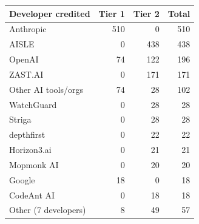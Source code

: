 \begin{tabular}{lrrr}
\toprule
Developer credited & Tier 1 & Tier 2 & Total \\
\midrule
Anthropic & 510 & 0 & 510 \\
AISLE & 0 & 438 & 438 \\
OpenAI & 74 & 122 & 196 \\
ZAST.AI & 0 & 171 & 171 \\
Other AI tools/orgs & 74 & 28 & 102 \\
WatchGuard & 0 & 28 & 28 \\
Striga & 0 & 28 & 28 \\
depthfirst & 0 & 22 & 22 \\
Horizon3.ai & 0 & 21 & 21 \\
Mopmonk AI & 0 & 20 & 20 \\
Google & 18 & 0 & 18 \\
CodeAnt AI & 0 & 18 & 18 \\
Other (7 developers) & 8 & 49 & 57 \\
\bottomrule
\end{tabular}